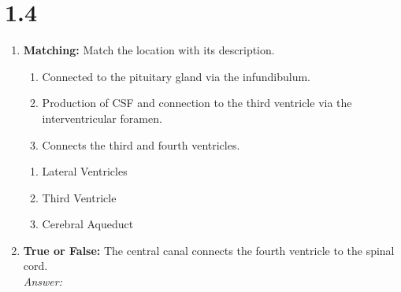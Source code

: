 \section*{1.4 \squigglyline}
\begin{enumerate}[label=\textbf{Q1.4.\arabic*}]
      \item \textbf{Matching:} Match the location with its description.
            \begin{wordbox}
                  \begin{enumerate}[label=(\roman*)]
                        \item Connected to the pituitary gland via the infundibulum.
                        \item Production of CSF and connection to the third ventricle via the interventricular foramen.
                        \item Connects the third and fourth ventricles.
                  \end{enumerate}
            \end{wordbox}
            \begin{enumerate}[label=(\alph*)]
                  \item Lateral Ventricles \quad \dotfill \quad \underline{\hspace{3cm}}\\[0.5em]
                  \item Third Ventricle \quad \dotfill \quad \underline{\hspace{3cm}}\\[0.5em]
                  \item Cerebral Aqueduct \quad \dotfill \quad \underline{\hspace{3cm}}
            \end{enumerate}

      \item \textbf{True or False:} The central canal connects the fourth ventricle to the spinal cord. \\
            \textit{Answer:} %
\end{enumerate}

